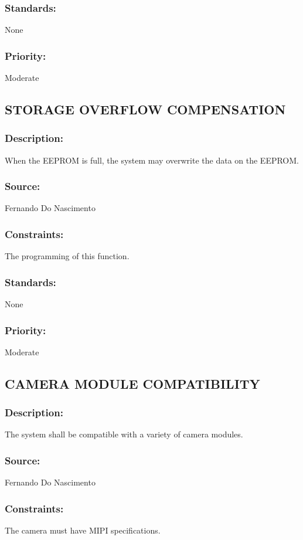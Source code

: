 \subsubsection{Standards:} 
	{None}
\subsubsection{Priority:} 
	{Moderate}

\subsection{\text STORAGE OVERFLOW COMPENSATION}
\subsubsection{Description:} 
	{When the EEPROM is full, the system may overwrite the data on the EEPROM.}
\subsubsection{Source:} 
	{Fernando Do Nascimento}
\subsubsection{Constraints:} 
	{The programming of this function.}
\subsubsection{Standards:} 
	{None}
\subsubsection{Priority:} 
	{Moderate}

\subsection{\text CAMERA MODULE COMPATIBILITY}
\subsubsection{Description:} 
	{The system shall be compatible with a variety of camera modules.}
\subsubsection{Source:} 
	{Fernando Do Nascimento}
\subsubsection{Constraints:} 
	{The camera must have MIPI specifications.}
